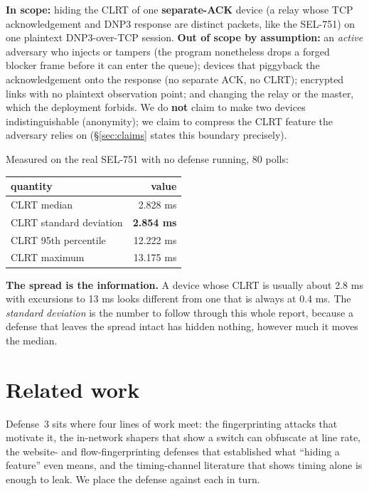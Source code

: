 \documentclass[10pt,a4paper,oneside]{article}
\newcommand{\num}[1]{\mbox{#1}}
\begin{document}
\textbf{In scope:} hiding the CLRT of one \textbf{separate-ACK} device (a relay whose TCP
acknowledgement and DNP3 response are distinct packets, like the SEL-751) on one plaintext
DNP3-over-TCP session. \textbf{Out of scope by assumption:} an \emph{active} adversary who
injects or tampers (the program nonetheless drops a forged blocker frame before it can enter
the queue); devices that piggyback the acknowledgement onto the response (no separate ACK,
no CLRT); encrypted links with no plaintext observation point; and changing the relay or the
master, which the deployment forbids. We do \textbf{not} claim to make two devices
indistinguishable (anonymity); we claim to compress the CLRT feature the adversary relies on
(\S\ref{sec:claims} states this boundary precisely).

Measured on the real SEL-751 with no defense running, 80 polls:

\begin{center}
\begin{tabular}{lr}
\toprule
\textbf{quantity} & \textbf{value} \\
\midrule
CLRT median & \num{2.828} ms \\
CLRT standard deviation & \textbf{\num{2.854} ms} \\
CLRT 95th percentile & \num{12.222} ms \\
CLRT maximum & \num{13.175} ms \\
\bottomrule
\end{tabular}
\end{center}

\textbf{The spread is the information.} A device whose CLRT is usually about \num{2.8} ms
with excursions to \num{13} ms looks different from one that is always at \num{0.4} ms.
The \emph{standard deviation} is the number to follow through this whole report, because a
defense that leaves the spread intact has hidden nothing, however much it moves the
median.

\section{Related work}
\label{sec:related}

Defense~3 sits where four lines of work meet: the fingerprinting attacks that
motivate it, the in-network shapers that show a switch can obfuscate at line rate, the
website- and flow-fingerprinting defenses that established what ``hiding a feature'' even
means, and the timing-channel literature that shows timing alone is enough to leak. We place the
defense against each in turn.
\end{document}
